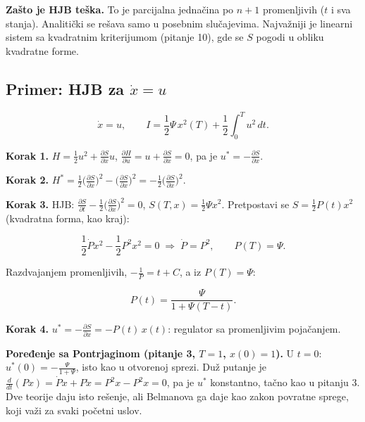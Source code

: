 \documentclass[11pt,a4paper,parskip=half,headsepline,numbers=noenddot]{scrartcl}
\begin{document}
\textbf{Zašto je HJB teška.} To je parcijalna jednačina po \(n + 1\) promenljivih (\(t\) i sva stanja). Analitički se rešava samo u posebnim slučajevima. Najvažniji je linearni sistem sa kvadratnim kriterijumom (pitanje 10), gde se \(S\) pogodi u obliku kvadratne forme.

\subsection{\texorpdfstring{Primer: HJB za \(\dot x = u\)}{Primer: HJB za \textbackslash dot x = u}}

\[\dot x = u, \qquad I = \frac12\Psi\,x^2(T) + \frac12\int_0^Tu^2\,dt .\]

\textbf{Korak 1.} \(H = \frac12u^2 + \frac{\partial S}{\partial x}u\), \(\frac{\partial H}{\partial u} = u + \frac{\partial S}{\partial x} = 0\), pa je \(u^* = -\frac{\partial S}{\partial x}\).

\textbf{Korak 2.} \(H^* = \frac12\big(\frac{\partial S}{\partial x}\big)^2 - \big(\frac{\partial S}{\partial x}\big)^2 = -\frac12\big(\frac{\partial S}{\partial x}\big)^2\).

\textbf{Korak 3.} HJB: \(\frac{\partial S}{\partial t} - \frac12\big(\frac{\partial S}{\partial x}\big)^2 = 0\), \(S(T, x) = \frac12\Psi x^2\). Pretpostavi se \(S = \frac12P(t)x^2\) (kvadratna forma, kao kraj):

\[\frac12\dot Px^2 - \frac12P^2x^2 = 0 \;\Rightarrow\; \dot P = P^2, \qquad P(T) = \Psi .\]

Razdvajanjem promenljivih, \(-\frac1P = t + C\), a iz \(P(T) = \Psi\):

\[P(t) = \frac{\Psi}{1 + \Psi(T - t)} .\]

\textbf{Korak 4.} \(u^* = -\frac{\partial S}{\partial x} = -P(t)\,x(t)\): regulator sa promenljivim pojačanjem.

\textbf{Poređenje sa Pontrjaginom (pitanje 3, \(T = 1\), \(x(0) = 1\)).} U \(t = 0\): \(u^*(0) = -\frac{\Psi}{1 + \Psi}\), isto kao u otvorenoj sprezi. Duž putanje je \(\frac{d}{dt}(Px) = \dot Px + P\dot x = P^2x - P^2x = 0\), pa je \(u^*\) konstantno, tačno kao u pitanju 3. Dve teorije daju isto rešenje, ali Belmanova ga daje kao zakon povratne sprege, koji važi za svaki početni uslov.
\end{document}
